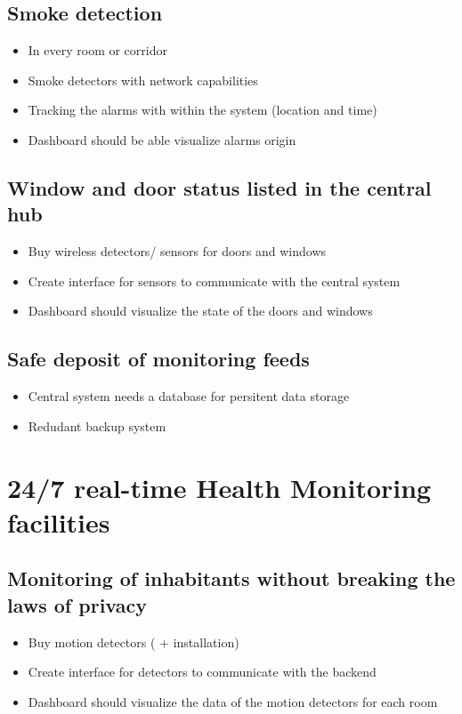 \documentclass
[
 12pt, %
       DIV12,
       a4paper, %
       oneside, %
       titlepage, %
       parskip=half, %
       headings=normal, %
       listof=totoc, %
       bibliography=totoc, %
       index=totoc, %
       captions=tableheading, %
       ]{scrreprt}
\begin{document}
\section{Smoke detection}
\label{sec:org27119f7}
\begin{itemize}
\item In every room or corridor
\item Smoke detectors with network capabilities
\item Tracking the alarms with within the system (location and time)
\item Dashboard should be able visualize alarms origin
\end{itemize}

\section{Window and door status listed in the central hub}
\label{sec:orgfb89528}
\begin{itemize}
\item Buy wireless detectors/ sensors for doors and windows
\item Create interface for sensors to communicate with the central system
\item Dashboard should visualize the state of the doors and windows
\end{itemize}
\section{Safe deposit of monitoring feeds}
\label{sec:orgc94021b}
\begin{itemize}
\item Central system needs a database for persitent data storage
\item Redudant backup system
\end{itemize}

\chapter{24/7 real-time Health Monitoring facilities}
\label{sec:orgf79df84}
\section{Monitoring of inhabitants without breaking the laws of privacy}
\label{sec:org7ea218f}
\begin{itemize}
\item Buy motion detectors ( + installation)
\item Create interface for detectors to communicate with the backend
\item Dashboard should visualize the data of the motion detectors for each room
\end{itemize}
\end{document}
